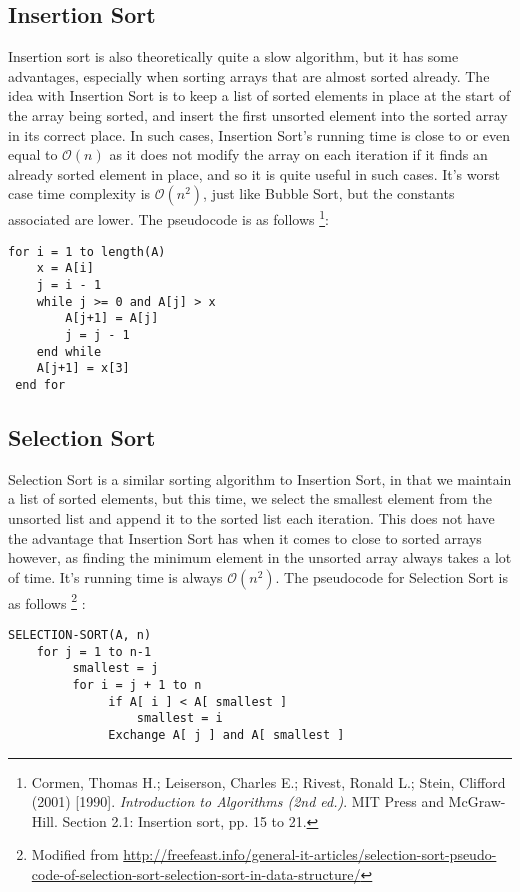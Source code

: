 \documentclass[12pt]{article}
\begin{document}
		\subsection{Insertion Sort}
		Insertion sort is also theoretically quite a slow algorithm, but it has some advantages, especially when sorting arrays that are almost sorted already. The idea with Insertion Sort is to keep a list of sorted elements in place at the start of the array being sorted, and insert the first unsorted element into the sorted array in its correct place. In such cases, Insertion Sort's running time is close to or even equal to $ \mathcal{O} (n) $ as it does not modify the array on each iteration if it finds an already sorted element in place, and so it is quite useful in such cases. It's worst case time complexity is $ \mathcal{O} (n^2) $, just like Bubble Sort, but the constants associated are lower. The pseudocode is as follows \footnote{Cormen, Thomas H.; Leiserson, Charles E.; Rivest, Ronald L.; Stein, Clifford (2001) [1990]. \textit{Introduction to Algorithms (2nd ed.)}. MIT Press and McGraw-Hill. Section 2.1: Insertion sort, pp. 15 to 21. }: 
		
		\begin{verbatim}
for i = 1 to length(A)
    x = A[i]
    j = i - 1
    while j >= 0 and A[j] > x
        A[j+1] = A[j]
        j = j - 1
    end while
    A[j+1] = x[3]
 end for
		\end{verbatim}
		
		\subsection{Selection Sort}
		Selection Sort is a similar sorting algorithm to Insertion Sort, in that we maintain a list of sorted elements, but this time, we select the smallest element from the unsorted list and append it to the sorted list each iteration. This does not have the advantage that Insertion Sort has when it comes to close to sorted arrays however, as finding the minimum element in the unsorted array always takes a lot of time. It's running time is always $ \mathcal{O} (n^2) $. The pseudocode for Selection Sort is as follows \footnote{Modified from \url{http://freefeast.info/general-it-articles/selection-sort-pseudo-code-of-selection-sort-selection-sort-in-data-structure/}} :
		
		\begin{verbatim}
SELECTION-SORT(A, n)
    for j = 1 to n-1
         smallest = j
       	 for i = j + 1 to n
              if A[ i ] < A[ smallest ]
                  smallest = i
          	  Exchange A[ j ] and A[ smallest ]
		\end{verbatim}
			
\end{document}
